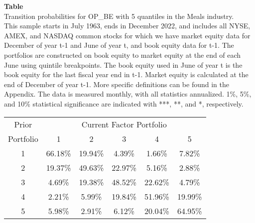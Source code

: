 \begin{table*}[ht!]
\raggedright
{}
\label{tab: transition_probs_OP_BE_Meals_with_5_quantiles}
\textbf{Table \thetable} \\
Transition probabilities for OP_BE with 5 quantiles in the Meals industry. \\
\hspace*{1em}This sample starts in July 1963, ends in December 2022, and includes all NYSE, AMEX, and NASDAQ common stocks for which we have market equity data for December of year t-1 and June of year t, and book equity data for t-1. The portfolios are constructed on book equity to market equity at the end of each June using quintile breakpoints.  The book equity used in June of year t is the book equity for the last fiscal year end in t-1.  Market equity is calculated at the end of December of year t-1.  More specific definitions can be found in the Appendix.  The data is measured monthly, with all statistics annualized.  1\%, 5\%, and 10\% statistical significance are indicated with ***, **, and *, respectively. \\
\vspace{0.5em}
\centering
\begin{adjustbox}{max width=\textwidth}
\begin{tabular}{@{}cccccc@{}}
\toprule
Prior & \multicolumn{5}{c}{Current Factor Portfolio} \\
Portfolio & 1 & 2 & 3 & 4 & 5 \\
\midrule
1 & 66.18\% & 19.94\% & 4.39\% & 1.66\% & 7.82\% \\
2 & 19.37\% & 49.63\% & 22.97\% & 5.16\% & 2.88\% \\
3 & 4.69\% & 19.38\% & 48.52\% & 22.62\% & 4.79\% \\
4 & 2.21\% & 5.99\% & 19.84\% & 51.96\% & 19.99\% \\
5 & 5.98\% & 2.91\% & 6.12\% & 20.04\% & 64.95\% \\
\bottomrule
\end{tabular}
\end{adjustbox}
\end{table*}